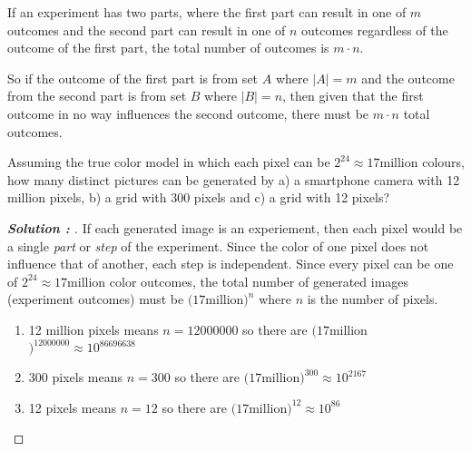 \documentclass[11pt]{article}
\newenvironment{solution}[1][]{%
  \renewcommand\qedsymbol{$\blacksquare$}%
  \def\temp{\normalfont\bfseries Solution \theexample: #1}
  \begin{proof}[\temp]
  \normalfont %
}{%
  \end{proof}
}
\begin{document}
\begin{definition}
  \label{sec:Step-Rule-Counting}
    If an experiment has two parts, where the first part can result in one of $m$ outcomes and the second part can result in one of $n$
    outcomes regardless of the outcome of the first part, the total number of outcomes is $m \cdot n$.
\end{definition}
So if the outcome of the first part is from set $A$ where $|A|=m$ and the outcome from the second part is from set $B$ where $|B|=n$, then
given that the first outcome in no way influences the second outcome, there must be $m\cdot n$ total outcomes.
\begin{example}
    Assuming the true color model in which each pixel can be $2^{24} \approx 17$million colours, how many distinct pictures can be generated
    by a) a smartphone camera with 12 million pixels, b) a grid with 300 pixels and c) a grid with 12 pixels?
\end{example}
\begin{solution}
    If each generated image is an experiement, then each pixel would be a single \textit{part} or \textit{step} of the experiment. Since the
    color of one pixel does not influence that of another, each step is independent. Since every pixel can be one of $2^{24} \approx 17$million
    color outcomes, the total number of generated images (experiment outcomes) must be $(17$million$)^{n}$ where $n$ is the number of pixels.
    \begin{enumerate}[label=\alph*.]
        \item 12 million pixels means $n=12000000$ so there are $(17$million$)^{12000000} \approx 10^{86696638}$ 
        \item 300 pixels means $n=300$ so there are $(17$million$)^{300} \approx 10^{2167}$
        \item 12 pixels means $n=12$ so there are $(17$million$)^{12} \approx 10^{86}$ 
    \end{enumerate}    
\end{solution}
\end{document}
